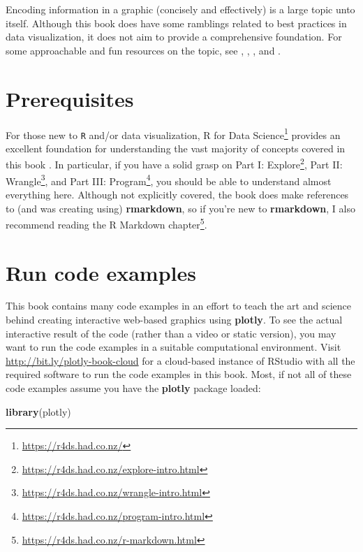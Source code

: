 \documentclass[
  12pt,
]{krantz}
\newenvironment{Shaded}{\begin{snugshade}}{\end{snugshade}}
\newcommand{\KeywordTok}[1]{\textcolor[rgb]{0.13,0.29,0.53}{\textbf{#1}}}
\newcommand{\NormalTok}[1]{#1}
\renewcommand{\href}[2]{#2\footnote{\url{#1}}}
\begin{document}
Encoding information in a graphic (concisely and effectively) is a large topic unto itself. Although this book does have some ramblings related to best practices in data visualization, it does not aim to provide a comprehensive foundation. For some approachable and fun resources on the topic, see \citet{tufte-dataviz}, \citet{yau-dataviz}, \citet{healey-dataviz}, and \citet{claus-dataviz}.

\hypertarget{prerequisites}{%
\section{Prerequisites}\label{prerequisites}}

For those new to \texttt{R} and/or data visualization, \href{https://r4ds.had.co.nz/}{R for Data Science} provides an excellent foundation for understanding the vast majority of concepts covered in this book \citep{r4ds}. In particular, if you have a solid grasp on \href{https://r4ds.had.co.nz/explore-intro.html}{Part I: Explore}, \href{https://r4ds.had.co.nz/wrangle-intro.html}{Part II: Wrangle}, and \href{https://r4ds.had.co.nz/program-intro.html}{Part III: Program}, you should be able to understand almost everything here. Although not explicitly covered, the book does make references to (and was creating using) \textbf{rmarkdown}, so if you're new to \textbf{rmarkdown}, I also recommend reading the \href{https://r4ds.had.co.nz/r-markdown.html}{R Markdown chapter}.

\hypertarget{run-code-examples}{%
\section{Run code examples}\label{run-code-examples}}

This book contains many code examples in an effort to teach the art and science behind creating interactive web-based graphics using \textbf{plotly}. To see the actual interactive result of the code (rather than a video or static version), you may want to run the code examples in a suitable computational environment. Visit \url{http://bit.ly/plotly-book-cloud} for a cloud-based instance of RStudio with all the required software to run the code examples in this book. Most, if not all of these code examples assume you have the \textbf{plotly} package loaded:

\begin{Shaded}
\begin{Highlighting}[]
\KeywordTok{library}\NormalTok{(plotly)}
\end{Highlighting}
\end{Shaded}
\end{document}
